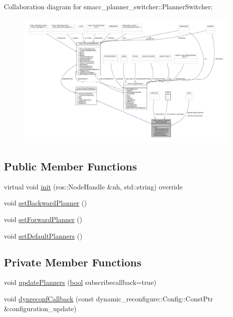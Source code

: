 Collaboration diagram for smacc\+\_\+planner\+\_\+switcher\+:\+:Planner\+Switcher\+:
\nopagebreak
\begin{figure}[H]
\begin{center}
\leavevmode
\includegraphics[width=350pt]{classsmacc__planner__switcher_1_1PlannerSwitcher__coll__graph}
\end{center}
\end{figure}
\subsection*{Public Member Functions}
\begin{DoxyCompactItemize}
\item 
virtual void \hyperlink{classsmacc__planner__switcher_1_1PlannerSwitcher_ae1e0ad820a95f2671a8967cfc45fb299}{init} (ros\+::\+Node\+Handle \&nh, std\+::string) override
\item 
void \hyperlink{classsmacc__planner__switcher_1_1PlannerSwitcher_a848558a4309a42c546ab87e65722da2f}{set\+Backward\+Planner} ()
\item 
void \hyperlink{classsmacc__planner__switcher_1_1PlannerSwitcher_a6510ee1f23243ee725c61e590354d3bc}{set\+Forward\+Planner} ()
\item 
void \hyperlink{classsmacc__planner__switcher_1_1PlannerSwitcher_a9672bbbb245b3a5120b365810c9cc746}{set\+Default\+Planners} ()
\end{DoxyCompactItemize}
\subsection*{Private Member Functions}
\begin{DoxyCompactItemize}
\item 
void \hyperlink{classsmacc__planner__switcher_1_1PlannerSwitcher_ae45c57b459f1eb9ee4cc3c6dc6dc0995}{update\+Planners} (\hyperlink{classbool}{bool} subscribecallback=true)
\item 
void \hyperlink{classsmacc__planner__switcher_1_1PlannerSwitcher_a19328a8a844797e39dd24736872bd442}{dynreconf\+Callback} (const dynamic\+\_\+reconfigure\+::\+Config\+::\+Const\+Ptr \&configuration\+\_\+update)
\end{DoxyCompactItemize}
